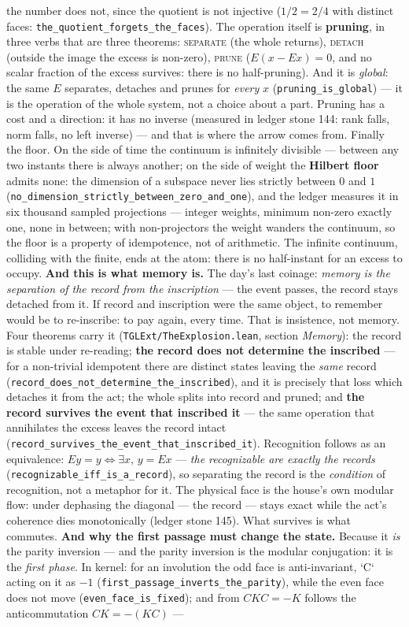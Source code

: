 \documentclass[11pt]{article}
\theoremstyle{definition}\newtheorem{deriv}{Derivation}
\begin{document}
the number does not, since the quotient is not injective ($1/2=2/4$ with distinct faces: \texttt{the\_quotient\_forgets\_the\_faces}). The operation itself is \textbf{pruning}, in three verbs that are three theorems: \textsc{separate} (the whole returns), \textsc{detach} (outside the image the excess is non-zero), \textsc{prune} ($E(x-Ex)=0$, and no scalar fraction of the excess survives: there is no half-pruning). And it is \emph{global}: the same $E$ separates, detaches and prunes for \emph{every} $x$ (\texttt{pruning\_is\_global}) --- it is the operation of the whole system, not a choice about a part. Pruning has a cost and a direction: it has no inverse (measured in ledger stone 144: rank falls, norm falls, no left inverse) --- and that is where the arrow comes from. Finally the floor. On the side of time the continuum is infinitely divisible --- between any two instants there is always another; on the side of weight the \textbf{Hilbert floor} admits none: the dimension of a subspace never lies strictly between $0$ and $1$ (\texttt{no\_dimension\_strictly\_between\_zero\_and\_one}), and the ledger measures it in six thousand sampled projections --- integer weights, minimum non-zero exactly one, none in between; with non-projectors the weight wanders the continuum, so the floor is a property of idempotence, not of arithmetic. The infinite continuum, colliding with the finite, ends at the atom: there is no half-instant for an excess to occupy. \textbf{And this is what memory is.} The day's last coinage: \emph{memory is the separation of the record from the inscription} --- the event passes, the record stays detached from it. If record and inscription were the same object, to remember would be to re-inscribe: to pay again, every time. That is insistence, not memory. Four theorems carry it (\texttt{TGLExt/TheExplosion.lean}, section \emph{Memory}): the record is stable under re-reading; \textbf{the record does not determine the inscribed} --- for a non-trivial idempotent there are distinct states leaving the \emph{same} record (\texttt{record\_does\_not\_determine\_the\_inscribed}), and it is precisely that loss which detaches it from the act; the whole splits into record and pruned; and \textbf{the record survives the event that inscribed it} --- the same operation that annihilates the excess leaves the record intact (\texttt{record\_survives\_the\_event\_that\_inscribed\_it}). Recognition follows as an equivalence: $Ey=y \iff \exists x,\, y=Ex$ --- \emph{the recognizable are exactly the records} (\texttt{recognizable\_iff\_is\_a\_record}), so separating the record is the \emph{condition} of recognition, not a metaphor for it. The physical face is the house's own modular flow: under dephasing the diagonal --- the record --- stays exact while the act's coherence dies monotonically (ledger stone 145). What survives is what commutes. \textbf{And why the first passage must change the state.} Because it \emph{is} the parity inversion --- and the parity inversion is the modular conjugation: it is the \emph{first phase}. In kernel: for an involution the odd face is anti-invariant, `C` acting on it as $-1$ (\texttt{first\_passage\_inverts\_the\_parity}), while the even face does not move (\texttt{even\_face\_is\_fixed}); and from $CKC=-K$ follows the anticommutation $CK=-(KC)$ --- 
\end{document}
